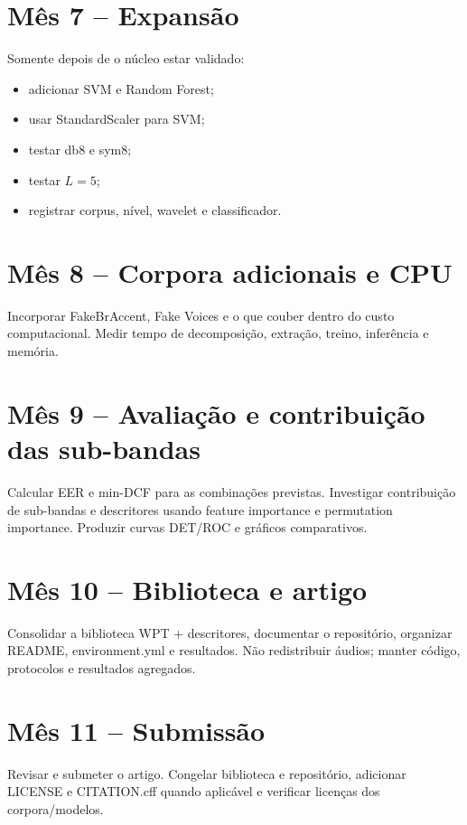 \documentclass[12pt,a4paper]{article}
\begin{document}
\section{Mês 7 -- Expansão}

Somente depois de o núcleo estar validado:
\begin{itemize}
\item adicionar SVM e Random Forest;
\item usar StandardScaler para SVM;
\item testar db8 e sym8;
\item testar $L=5$;
\item registrar corpus, nível, wavelet e classificador.
\end{itemize}

\section{Mês 8 -- Corpora adicionais e CPU}

Incorporar FakeBrAccent, Fake Voices e o que couber dentro do custo computacional. Medir tempo de decomposição, extração, treino, inferência e memória.

\section{Mês 9 -- Avaliação e contribuição das sub-bandas}

Calcular EER e min-DCF para as combinações previstas. Investigar contribuição de sub-bandas e descritores usando feature importance e permutation importance. Produzir curvas DET/ROC e gráficos comparativos.

\section{Mês 10 -- Biblioteca e artigo}

Consolidar a biblioteca WPT + descritores, documentar o repositório, organizar README, environment.yml e resultados. Não redistribuir áudios; manter código, protocolos e resultados agregados.

\section{Mês 11 -- Submissão}

Revisar e submeter o artigo. Congelar biblioteca e repositório, adicionar LICENSE e CITATION.cff quando aplicável e verificar licenças dos corpora/modelos.
\end{document}
